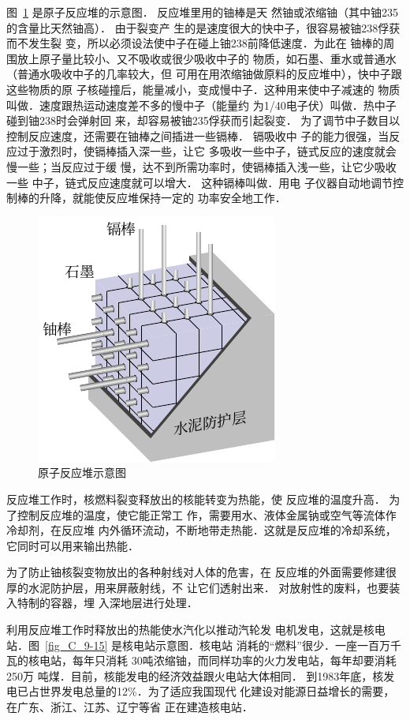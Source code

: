 图~\ref{fig_C_9-14} 是原子反应堆的示意图．
反应堆里用的铀棒是天
然铀或浓缩铀（其中铀235的含量比天然铀高）．
由于裂变产
生的是速度很大的快中子，很容易被铀238俘获而不发生裂
变，所以必须设法使中子在碰上铀238前降低速度．为此在
铀棒的周围放上原子量比较小、又不吸收或很少吸收中子的
物质，如石墨、重水或普通水（普通水吸收中子的几率较大，但
可用在用浓缩铀做原料的反应堆中），快中子跟这些物质的原
子核碰撞后，能量减小，变成慢中子．这种用来使中子减速的
物质叫做．速度跟热运动速度差不多的慢中子（能量约
为1/40电子伏）叫做．热中子碰到铀238时会弹射回
来，却容易被铀235俘获而引起裂变．
为了调节中子数目以
控制反应速度，还需要在铀棒之间插进一些镉棒．
镉吸收中
子的能力很强，当反应过于激烈时，使镉棒插入深一些，让它
多吸收一些中子，链式反应的速度就会慢一些；当反应过于缓
慢，达不到所需功率时，使镉棒插入浅一些，让它少吸收一些
中子，链式反应速度就可以增大．
这种镉棒叫做．用电
子仪器自动地调节控制棒的升降，就能使反应堆保持一定的
功率安全地工作．
\begin{figure}[htbp]
	\centering
	\includegraphics{fig/C/9-14.pdf}
	\caption{原子反应堆示意图}\label{fig_C_9-14}
\end{figure}



反应堆工作时，核燃料裂变释放出的核能转变为热能，使
反应堆的温度升高．
为了控制反应堆的温度，使它能正常工
作，需要用水、液体金属钠或空气等流体作冷却剂，在反应堆
内外循环流动，不断地带走热能．这就是反应堆的冷却系统，
它同时可以用来输出热能．

为了防止铀核裂变物放出的各种射线对人体的危害，在
反应堆的外面需要修建很厚的水泥防护层，用来屏蔽射线，不
让它们透射出来．
对放射性的废料，也要装入特制的容器，埋
入深地层进行处理．

利用反应堆工作时释放出的热能使水汽化以推动汽轮发
电机发电，这就是核电站．图~\ref{fig_C_9-15} 是核电站示意图．核电站
消耗的“燃料”很少．一座一百万千瓦的核电站，每年只消耗
30吨浓缩铀，而同样功率的火力发电站，每年却要消耗250万
吨煤．目前，核能发电的经济效益跟火电站大体相同．
到1983年底，核发电已占世界发电总量的12\%．为了适应我国现代
化建设对能源日益增长的需要，在广东、浙江、江苏、辽宁等省
正在建造核电站．

